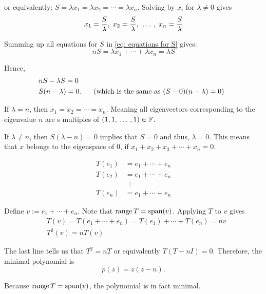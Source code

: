 \begin{xrcs}
\begin{xsol}
    or equivalently: $S = \lambda x_1 = \lambda x_2 = \cdots = \lambda x_n$. Solving by $x_i$ for $\lambda \neq 0$ gives
    \begin{equation}
      x_1 = \dfrac{S}{\lambda}, \; x_2 = \dfrac{S}{\lambda}, \; {\, \ldots \,\,}, \; x_n = \dfrac{S}{\lambda}
    \end{equation}

    Summing up all equations for $S$ in \eqref{eq: equations for S} gives:
    \begin{equation}
      nS = \lambda x_1 + \cdots + \lambda x_n = \lambda S
    \end{equation}

    Hence,
    \begin{equation}
      \begin{aligned}
        &nS - \lambda S = 0 \\
        &S (n-\lambda) = 0. \quad \;\;\, \text{(which is the same as $(S-0)(n-\lambda) = 0$)}\;\;
      \end{aligned}
    \end{equation}

    If $\lambda = n$, then $x_1 = x_2 = \cdots = x_n$. Meaning all eigenvectors corresponding to the eigenvalue $n$ are s multiples of $(1, 1, {\, \ldots \,\,} ,1 ) \in \mathbb{F}$.

    If $\lambda \neq n$, then $S ( \lambda - n) = 0$ implies that $S=0$ and thus, $\lambda = 0$. This means that $x$ belongs to the eigenspace of $0$, if $x_1 + x_2 + x_3 + \cdots + x_n = 0$.

    \begin{equation}
      \begin{aligned}
        T(e_1) &= e_1 + \cdots + e_n \\
        T(e_2) &= e_1 + \cdots + e_n \\
        & \; \; \vdots \\
        T(e_n) &= e_1 + \cdots + e_n
      \end{aligned}
    \end{equation}

    Define $v := e_1 + \cdots + e_n$. Note that $\operatorname{range} T = \operatorname{span} (v)$. Applying $T$ to $v$ gives
    \begin{equation}
      \begin{aligned}
        &T(v) = T(e_1 + \cdots + e_n) = T(e_1) + \cdots + T(e_n) = n v \\
        &T^2(v) = n T(v) %
      \end{aligned}
    \end{equation}

    The last line tells us that $T^2 = nT$ or equivalently $T(T-nI) = 0$. Therefore, the minimal polynomial is
    \begin{equation}
      p(z) = z(z-n).
    \end{equation}

    Because $\operatorname{range} T = \operatorname{span} (v)$, the polynomial is in fact minimal.
  \end{xsol}
\end{xrcs}

